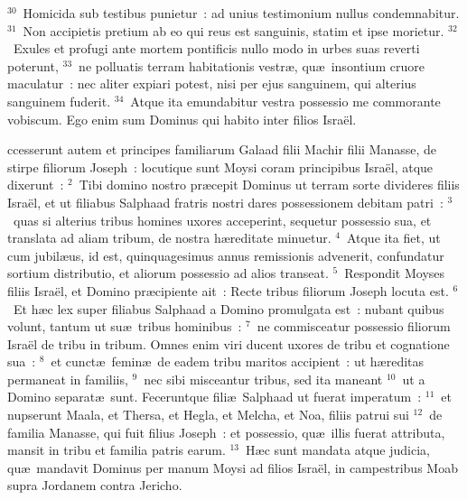 ${}^{30}$~Homicida sub testibus punietur~: ad unius testimonium nullus condemnabitur.
${}^{31}$~Non accipietis pretium ab eo qui reus est sanguinis, statim et ipse morietur.
${}^{32}$~Exules et profugi ante mortem pontificis nullo modo in urbes suas reverti poterunt,
${}^{33}$~ne polluatis terram habitationis vestr\ae , qu\ae\ insontium cruore maculatur~: nec aliter expiari potest, nisi per ejus sanguinem, qui alterius sanguinem fuderit.
${}^{34}$~Atque ita emundabitur vestra possessio me commorante vobiscum. Ego enim sum Dominus qui habito inter filios Isra\"el.

\bchapter
{}ccesserunt autem et principes familiarum Galaad filii Machir filii Manasse, de stirpe filiorum Joseph~: locutique sunt Moysi coram principibus Isra\"el, atque dixerunt~:
${}^{2}$~Tibi domino nostro pr\ae cepit Dominus ut terram sorte divideres filiis Isra\"el, et ut filiabus Salphaad fratris nostri dares possessionem debitam patri~:
${}^{3}$~quas si alterius tribus homines uxores acceperint, sequetur possessio sua, et translata ad aliam tribum, de nostra h\ae reditate minuetur.
${}^{4}$~Atque ita fiet, ut cum jubil\ae us, id est, quinquagesimus annus remissionis advenerit, confundatur sortium distributio, et aliorum possessio ad alios transeat.
${}^{5}$~Respondit Moyses filiis Isra\"el, et Domino pr\ae cipiente ait~: Recte tribus filiorum Joseph locuta est.
${}^{6}$~Et h\ae c lex super filiabus Salphaad a Domino promulgata est~: nubant quibus volunt, tantum ut su\ae\ tribus hominibus~:
${}^{7}$~ne commisceatur possessio filiorum Isra\"el de tribu in tribum. Omnes enim viri ducent uxores de tribu et cognatione sua~:
${}^{8}$~et cunct\ae\ femin\ae\ de eadem tribu maritos accipient~: ut h\ae reditas permaneat in familiis,
${}^{9}$~nec sibi misceantur tribus, sed ita maneant
${}^{10}$~ut a Domino separat\ae\ sunt. Feceruntque fili\ae\ Salphaad ut fuerat imperatum~:
${}^{11}$~et nupserunt Maala, et Thersa, et Hegla, et Melcha, et Noa, filiis patrui sui
${}^{12}$~de familia Manasse, qui fuit filius Joseph~: et possessio, qu\ae\ illis fuerat attributa, mansit in tribu et familia patris earum.
${}^{13}$~H\ae c sunt mandata atque judicia, qu\ae\ mandavit Dominus per manum Moysi ad filios Isra\"el, in campestribus Moab supra Jordanem contra Jericho.
